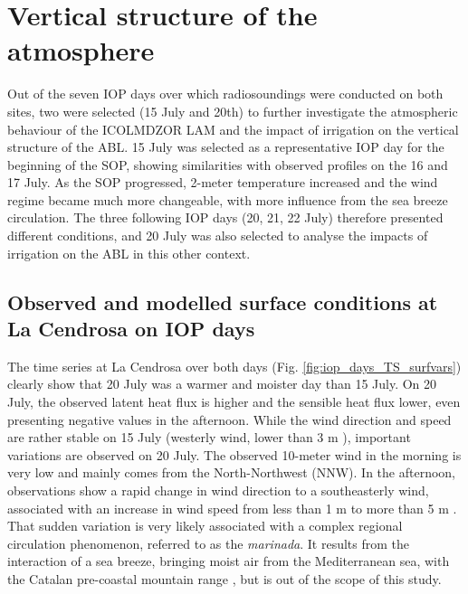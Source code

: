 \clearpage

\section{Vertical structure of the atmosphere}
\label{sec:iop}

Out of the seven IOP days over which radiosoundings were conducted on both sites, two were selected (15 July and 20th) to further investigate the atmospheric behaviour of the ICOLMDZOR LAM and the impact of irrigation on the vertical structure of the ABL. 
15 July was selected as a representative IOP day for the beginning of the SOP, showing similarities with observed profiles on the 16 and 17 July. As the SOP progressed, 2-meter temperature increased and the wind regime became much more changeable, with more influence from the sea breeze circulation.
The three following IOP days (20, 21, 22 July) therefore presented different conditions, and 20 July was also selected to analyse the impacts of irrigation on the ABL in this other context.

\subsection{Observed and modelled surface conditions at La Cendrosa on IOP days}

The time series at La Cendrosa over both days (Fig. \ref{fig:iop_days_TS_surfvars}) clearly show that 20 July was a warmer and moister day than 15 July.
On 20 July, the observed latent heat flux is higher and the sensible heat flux lower, even presenting negative values in the afternoon.
While the wind direction and speed are rather stable on 15 July (westerly wind, lower than 3 m \persec), important variations are observed on 20 July.
The observed 10-meter wind in the morning is very low and mainly comes from the North-Northwest (NNW). 
In the afternoon, observations show a rapid change in wind direction to a southeasterly wind, associated with an increase in wind speed from less than 1 m \persec to more than 5 m \persec. That sudden variation is very likely associated with a complex regional circulation phenomenon, referred to as the \textit{marinada}. It results from the interaction of a sea breeze, bringing moist air from the Mediterranean sea, with the Catalan pre-coastal mountain range \citep{lunel_marinada_2024}, but is out of the scope of this study.

\hfill

